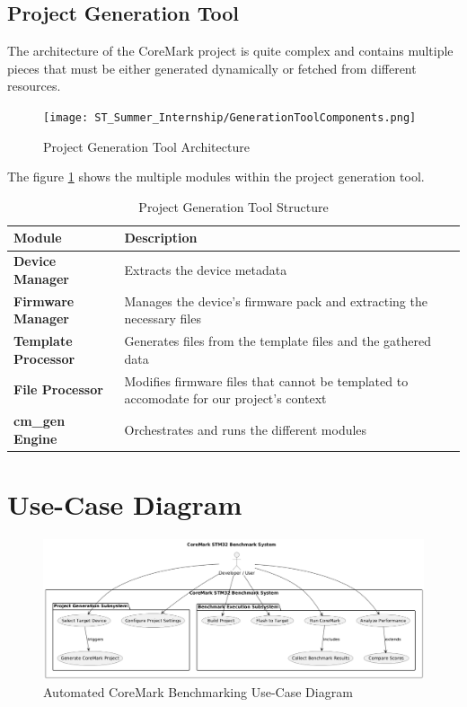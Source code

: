 \subsection{Project Generation Tool}
The architecture of the CoreMark project is quite complex and contains multiple pieces that must be either generated dynamically or fetched from different resources.
\begin{figure}[H]
    \centering
    \texttt{[image: ST\_Summer\_Internship/GenerationToolComponents.png]}
    \caption{Project Generation Tool Architecture}
    \label{fig:gen_tool_arch}
\end{figure}
The figure \ref{fig:gen_tool_arch} shows the multiple modules within the project generation tool.
\begin{table}[htbp]
   \centering
   \caption{Project Generation Tool Structure}
   \begin{tabularx}{\linewidth}{@{}>{\bfseries}l X X@{}}
    \toprule
    Module & Description \\
    \midrule
       Device Manager & Extracts the device metadata \\
    \midrule
       Firmware Manager & Manages the device's firmware pack and extracting the necessary files \\
    \midrule
       Template Processor & Generates files from the template files and the gathered data \\
    \midrule
       File Processor & Modifies firmware files that cannot be templated to accomodate for our project's context \\
    \midrule
       cm\_gen Engine & Orchestrates and runs the different modules \\
    \bottomrule
   \end{tabularx}
\end{table}

\section{Use-Case Diagram}

\begin{figure}[H]
	\centering
	\includegraphics[width=15cm]{img/ST_Summer_Internship/use_case2.png}
	\caption{Automated CoreMark Benchmarking Use-Case Diagram}
	\label{fig:use_case_diagram}
\end{figure}

